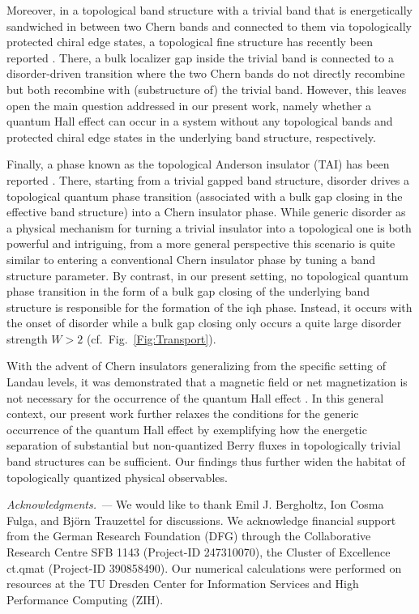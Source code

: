 \documentclass[aps,prb,amsmath,amssymb,twocolumn, superscriptaddress]{revtex4-2}
\begin{document}
Moreover, in a topological band structure with a trivial band that is energetically sandwiched in between two Chern bands and connected to them via topologically protected chiral edge states, a topological fine structure has recently been reported \cite{Fine_structure}. There, a bulk localizer gap inside the trivial band is connected to a disorder-driven transition where the two Chern bands do not directly recombine but both recombine with (substructure of) the trivial band. However, this leaves open the main question addressed in our present work, namely whether a quantum Hall effect can occur in a system without any topological bands and protected chiral edge states in the underlying band structure, respectively.

Finally, a phase known as the topological Anderson insulator (TAI) has been reported \cite{TAI, theory_TAI, Mobility_gap_TAI}. There, starting from a trivial gapped band structure, disorder drives a topological quantum phase transition (associated with a bulk gap closing in the effective band structure) into a Chern insulator phase. While generic disorder as a physical mechanism for turning a trivial insulator into a topological one is both powerful and intriguing, from a more general perspective this scenario is quite similar to entering a conventional Chern insulator phase by tuning a band structure parameter. By contrast, in our present setting, no topological quantum phase transition in the form of a bulk gap closing of the underlying band structure is responsible for the formation of the \gls{iqh} phase. Instead, it occurs with the onset of disorder while a bulk gap closing only occurs a quite large disorder strength $W>2$ (cf.~Fig.~\ref{Fig:Transport}).

With the advent of Chern insulators generalizing from the specific setting of Landau levels, it was demonstrated that a magnetic field or net magnetization is not necessary for the occurrence of the quantum Hall effect \cite{Haldane_1988}. In this general context, our present work further relaxes the conditions for the generic occurrence of the quantum Hall effect by exemplifying how the energetic separation of substantial but non-quantized Berry fluxes in topologically trivial band structures can be sufficient. Our findings thus further widen the habitat of topologically quantized physical observables.   

{\it Acknowledgments. ---}
We would like to thank Emil J. Bergholtz, Ion Cosma Fulga, and Bj\"orn Trauzettel for discussions. We acknowledge financial support from the German Research Foundation (DFG) through the Collaborative Research Centre SFB 1143  (Project-ID 247310070), the Cluster of Excellence ct.qmat (Project-ID 390858490). Our numerical calculations were performed on resources at the TU Dresden Center for Information Services and High Performance Computing (ZIH).
\end{document}
